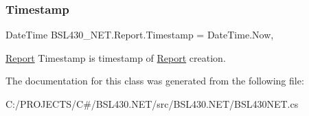 \mbox{\label{class_b_s_l430___n_e_t_1_1_report_aa445f580f3680b0260ee3fa30e7f8872}} 
\subsubsection{\texorpdfstring{Timestamp}{Timestamp}}
{\footnotesize\ttfamily Date\+Time B\+S\+L430\+\_\+\+N\+E\+T.\+Report.\+Timestamp = Date\+Time.\+Now\hspace{0.3cm}{\ttfamily [get]}, {\ttfamily [set]}}



\mbox{\hyperlink{class_b_s_l430___n_e_t_1_1_report}{Report}} Timestamp is timestamp of \mbox{\hyperlink{class_b_s_l430___n_e_t_1_1_report}{Report}} creation. 



The documentation for this class was generated from the following file\+:\begin{DoxyCompactItemize}
\item 
C\+:/\+P\+R\+O\+J\+E\+C\+T\+S/\+C\#/\+B\+S\+L430.\+N\+E\+T/src/\+B\+S\+L430.\+N\+E\+T/B\+S\+L430\+N\+E\+T.\+cs\end{DoxyCompactItemize}
